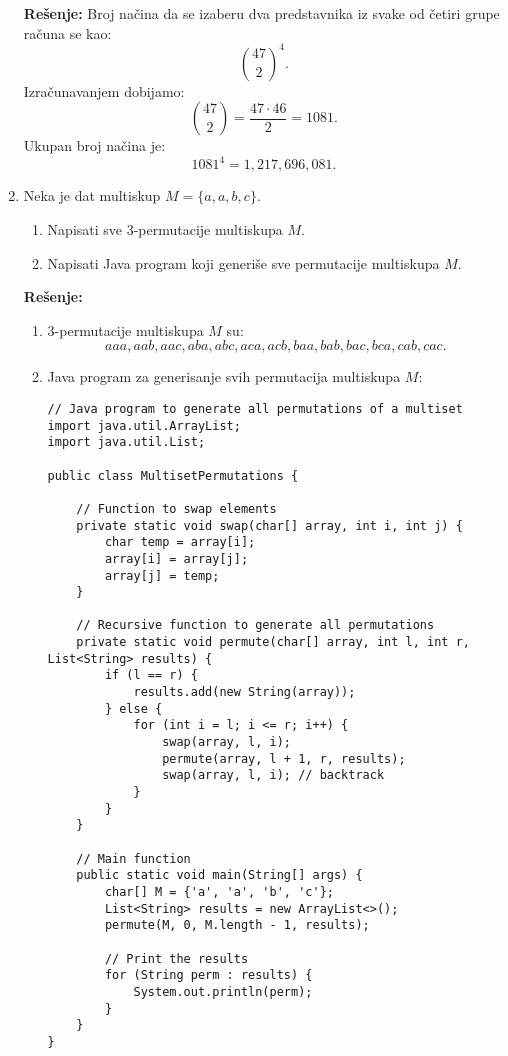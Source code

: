 \documentclass{article}
\begin{document}
\begin{enumerate}
    \textbf{Rešenje:}
    Broj načina da se izaberu dva predstavnika iz svake od četiri grupe računa se kao:
    \[
    \binom{47}{2}^4.
    \]
    Izračunavanjem dobijamo:
    \[
    \binom{47}{2} = \frac{47 \cdot 46}{2} = 1081.
    \]
    Ukupan broj načina je:
    \[
    1081^4 = 1,217,696,081.
    \]

    \item Neka je dat multiskup $M = \{a, a, b, c\}$.
    \begin{enumerate}
        \item Napisati sve 3-permutacije multiskupa $M$.
        \item Napisati Java program koji generiše sve permutacije multiskupa $M$.
    \end{enumerate}
    \textbf{Rešenje:}
    \begin{enumerate}
        \item 3-permutacije multiskupa $M$ su:
        \[
        aaa, aab, aac, aba, abc, aca, acb, baa, bab, bac, bca, cab, cac.
        \]
        \item Java program za generisanje svih permutacija multiskupa $M$:
        \begin{verbatim}
// Java program to generate all permutations of a multiset
import java.util.ArrayList;
import java.util.List;

public class MultisetPermutations {

    // Function to swap elements
    private static void swap(char[] array, int i, int j) {
        char temp = array[i];
        array[i] = array[j];
        array[j] = temp;
    }

    // Recursive function to generate all permutations
    private static void permute(char[] array, int l, int r, List<String> results) {
        if (l == r) {
            results.add(new String(array));
        } else {
            for (int i = l; i <= r; i++) {
                swap(array, l, i);
                permute(array, l + 1, r, results);
                swap(array, l, i); // backtrack
            }
        }
    }

    // Main function
    public static void main(String[] args) {
        char[] M = {'a', 'a', 'b', 'c'};
        List<String> results = new ArrayList<>();
        permute(M, 0, M.length - 1, results);

        // Print the results
        for (String perm : results) {
            System.out.println(perm);
        }
    }
}
        \end{verbatim}
    \end{enumerate}

\end{enumerate}
\end{document}
